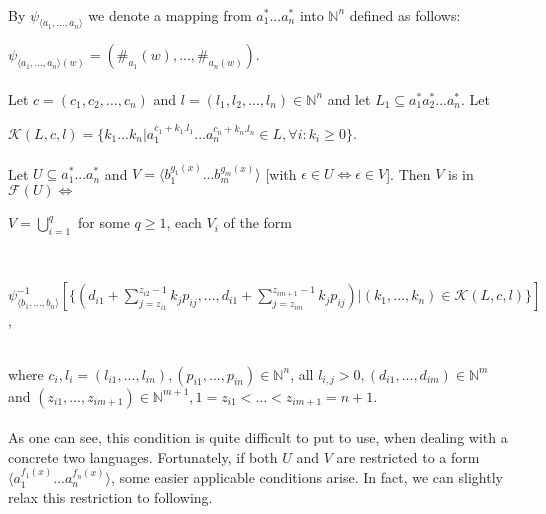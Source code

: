 \paragraph{}
\oznacenie By $\psi_{\langle a_{1},...,a_{n}\rangle }$ we denote a mapping from $a_{1}^{*}...a_{n}^{*}$ into $\mathbb{N}^{n}$ defined as follows: \\
\centerline{$\psi_{\langle a_{1},...,a_{n}\rangle (w) } = (\# _{a_{1}}(w), ..., \# _{a_{n}(w)}) $.}

\paragraph{}
\oznacenie Let $c = (c_{1}, c_{2}, ..., c_{n})$ and $l = (l_{1}, l_{2}, ..., l_{n}) \in \mathbb{N}^{n}$ and let $L_{1} \subseteq a_{1}^{*}a_{2}^{*}...a_{n}^{*}$. Let
\centerline{$\mathcal{K}(L, c, l) = \{ k_{1}...k_{n} | a_{1}^{c_{1}+k_{1}.l_{1}}...a_{n}^{c_{n}+k_{n}.l_{n}} \in L, \forall i: k_{i} \geq 0 \} $.}

\paragraph{}
\cveta Let $U \subseteq a_{1}^{*}...a_{n}^{*}$ and $V = \langle b_{1}^{g_{1}(x)}...b_{m}^{g_{m}(x)} \rangle $ [with $\epsilon \in U \Leftrightarrow \epsilon \in V$]. Then $V$ is in $\mathcal{F}(U) \Leftrightarrow $ \\
\centerline{$V = \bigcup_{i=1}^{q} $ for some $q \geq 1$, each $V_{i}$ of the form} \\
\centerline{$\psi_{\langle b_{1},...,b_{n}\rangle }^{-1} [ \{ ( d_{i1} + \sum_{j=z_{i1}}^{z_{i2} - 1} k_{j}p_{ij}, ..., d_{i1} + \sum_{j=z_{im}}^{z_{im+1} - 1} k_{j}p_{ij}) | (k_{1},...,k_{n}) \in \mathcal{K}(L, c, l) \} ]$, } \\
where $c_{i}, l_{i} = (l_{i1}, ..., l_{in}), (p_{i1},...,p_{in}) \in \mathbb{N}^{n}$, all $l_{i,j} > 0, (d_{i1}, ..., d_{im}) \in \mathbb{N}^{m}$ and $(z_{i1}, ..., z_{im+1}) \in \mathbb{N}^{m+1}, 1=z_{i1} < ... < z_{im+1} = n+1$.

\paragraph{}
As one can see, this condition is quite difficult to put to use, when dealing with a concrete two languages. Fortunately, if both $U$ and $V$ are restricted to a form $\langle a_{1}^{f_{1}(x)}...a_{n}^{f_{n}(x)} \rangle $, some easier applicable conditions arise. In fact, we can slightly relax this restriction to following.

